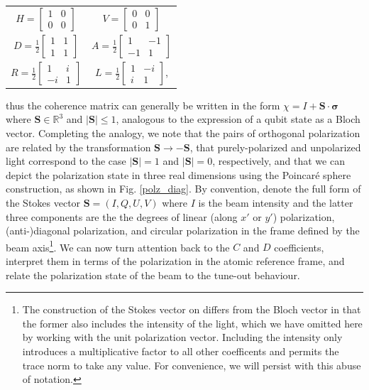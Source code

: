 	\begin{tabular}{c c}
		${H} = \begin{bmatrix}1&0\\0&0\end{bmatrix}$ 					& ${V} = \begin{bmatrix}0&0\\0&1\end{bmatrix}$\\
		${D} = \frac{1}{{2}}\begin{bmatrix}1&1\\1&1\end{bmatrix}$ &$ {A} = \frac{1}{{2}}\begin{bmatrix}1&-1\\-1&1\end{bmatrix}$\\
		${R} = \frac{1}{{2}}\begin{bmatrix}1&i\\-i&1\end{bmatrix}$ & ${L} = \frac{1}{{2}}\begin{bmatrix}1&-i\\i&1\end{bmatrix}$,
	\end{tabular}

	thus the coherence matrix can generally be written in the form $\chi = I + \mathbf{S}\cdot\mathbf{\sigma}$ where $\mathbf{S}\in\mathbb{R}^3$ and $|\mathbf{S}|\leq1$, analogous to the expression of a qubit state as a Bloch vector.
	Completing the analogy, we note that the pairs of orthogonal polarization are related by the transformation $\mathbf{S}\rightarrow-\mathbf{S}$, that purely-polarized and unpolarized light correspond to the case $|\mathbf{S}|=1$ and $|\mathbf{S}|=0$, respectively, and that we can depict the polarization state in three real dimensions using the Poincar\'{e} sphere construction, as shown in Fig. \ref{polz_diag}.
	By convention, denote the full form of the Stokes vector $\mathbf{S} = (I,Q,U,V)$ where $I$ is the beam intensity and the latter three components are the  the degrees of linear (along $x'$ or $y'$) polarization, (anti-)diagonal polarization, and circular polarization in the frame defined by the beam axis\footnote{The construction of the Stokes vector on differs from the Bloch vector in that the former also includes the intensity of the light, which we have omitted here by working with the unit polarization vector. Including the intensity only introduces a multiplicative factor to all other coefficents and permits the trace norm to take any value. For convenience, we will persist with this abuse of notation.}.
	We can now turn attention back to the $C$ and $D$ coefficients, interpret them in terms of the polarization in the atomic reference frame, and relate the polarization state of the beam to the tune-out behaviour.

